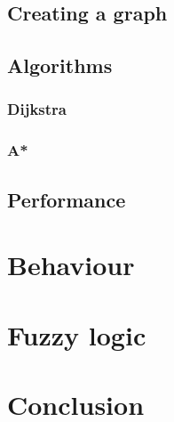 \documentclass[11pt]{article}
\begin{document}
    \subsection{Creating a graph}\label{subsec:pathgraphcreation}
    
    \subsection{Algorithms}\label{subsec:pathalgorithms}
    
    \subsubsection{Dijkstra}\label{sec:pathDijkstra}

    
    \subsubsection{A*}\label{sec:pathAstar}
    
    \subsection{Performance}\label{subsec:pathperformance}
    
    \newpage
    \section{Behaviour}\label{sec:behaviour}
    
    \newpage
    \section{Fuzzy logic}\label{sec:fuzzyLogic}

    \newpage
    \section{Conclusion}\label{sec:conclusion}

    \newpage

    
    
\end{document}
